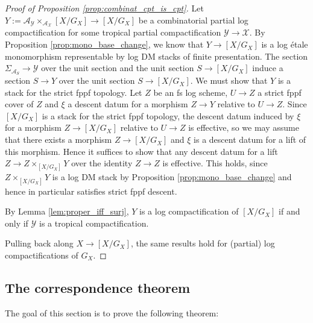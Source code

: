 \documentclass[11pt]{amsart}
\theoremstyle{definition}
\theoremstyle{remark}
\begin{document}
\begin{proof}[Proof of Proposition \ref{prop:combinat_cpt_is_cpt}]
	Let $Y:=\mathcal{A}_{\mathcal{Y}}\times_{\mathcal{A}_{\mathcal{X}}}[X/G_X]\to [X/G_X]$
	be a combinatorial partial log compactification for some tropical
	partial compactification $\mathcal{Y}\to \mathcal{X}$.
	By Proposition \ref{prop:mono_base_change}, we know that
	$Y\to [X/G_X]$ is a log étale monomorphism representable by
	log DM stacks of finite presentation. The section
	$\Sigma_{\mathcal{A}_S}\to \mathcal{Y}$ over the unit section
	and the unit section $S\to [X/G_X]$ induce a section
	$S\to Y$ over the unit section $S\to [X/G_X]$. We must show that
	$Y$ is a stack for the strict fppf topology. Let $Z$ be an fs
	log scheme, $U\to Z$ a strict fppf cover of $Z$ and $\xi$
	a descent datum for a morphism $Z\to Y$ relative to
	$U\to Z$. Since $[X/G_X]$ is a stack for the strict fppf topology,
	the descent datum induced by $\xi$ for a morphism $Z\to [X/G_X]$
	relative to $U\to Z$ is effective, so we may assume that
	there exists a morphism $Z\to [X/G_X]$ and $\xi$ is a descent
	datum for a lift of this morphism. Hence it suffices to
	show that any descent datum for a lift
	$Z\to Z\times_{[X/G_X]}Y$ over the identity $Z\to Z$ is effective.
	This holds, since $Z\times_{[X/G_X]}Y$ is a log DM stack
	by Proposition \ref{prop:mono_base_change} and hence in
	particular satisfies strict fppf descent.

	By Lemma \ref{lem:proper_iff_surj}, $Y$ is a log compactification
	of $[X/G_X]$ if and only if $\mathcal{Y}$ is a tropical compactification.

	Pulling back along $X\to [X/G_X]$, the same results hold
	for (partial) log compactifications of $G_X$.
\end{proof}

\subsection{The correspondence theorem}

The goal of this section is to prove the following theorem:
\end{document}
